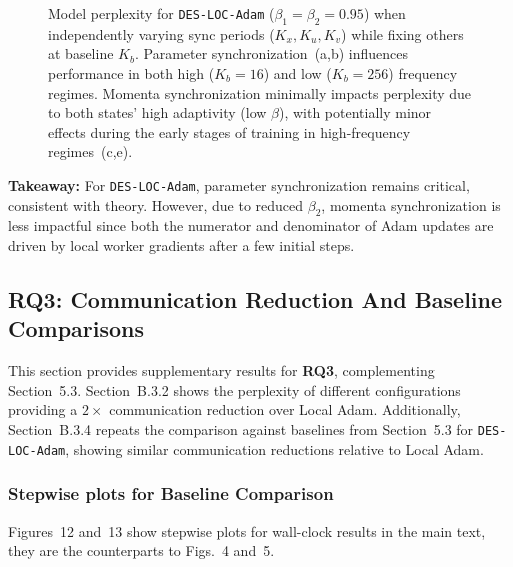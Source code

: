 \begin{figure}[ht]
\centering
\caption{Model perplexity for \texttt{DES-LOC-Adam} ($\beta_1=\beta_2=0.95$) when independently varying sync periods ($K_x, K_u, K_v$) while fixing others at baseline $K_b$. Parameter synchronization~(a,b) influences performance in both high ($K_b=16$) and low ($K_b=256$) frequency regimes. Momenta synchronization minimally impacts perplexity due to both states' high adaptivity (low $\beta$), with potentially minor effects during the early stages of training in high-frequency regimes~(c,e).}
\label{fig:11}
\end{figure}

\textbf{Takeaway:} For \texttt{DES-LOC-Adam}, parameter synchronization remains critical, consistent with theory. However, due to reduced $\beta_2$, momenta synchronization is less impactful since both the numerator and denominator of Adam updates are driven by local worker gradients after a few initial steps.

\subsection{RQ3: Communication Reduction And Baseline Comparisons}
\label{sec:b3_comm_reduction}

This section provides supplementary results for \textbf{RQ3}, complementing Section~5.3. Section~B.3.2 shows the perplexity of different configurations providing a $2\times$ communication reduction over Local Adam. Additionally, Section~B.3.4 repeats the comparison against baselines from Section~5.3 for \texttt{DES-LOC-Adam}, showing similar communication reductions relative to Local Adam.

\subsubsection{Stepwise plots for Baseline Comparison}
\label{sec:b31_stepwise}

Figures~12 and~13 show stepwise plots for wall-clock results in the main text, they are the counterparts to Figs.~4 and~5.


